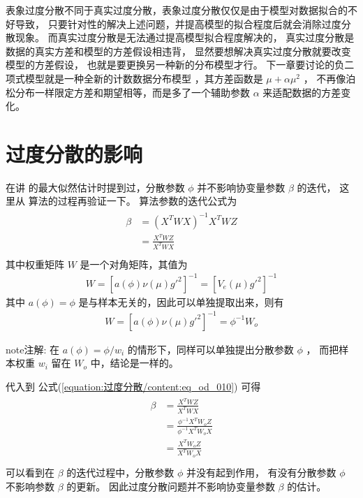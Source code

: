\documentclass[letterpaper,10pt,english]{sphinxmanual}
\begin{document}
表象过度分散不同于真实过度分散，表象过度分散仅仅是由于模型对数据拟合的不好导致，
只要针对性的解决上述问题，并提高模型的拟合程度后就会消除过度分散现象。
而真实过度分散是无法通过提高模型拟合程度解决的，
真实过度分散是数据的真实方差和模型的方差假设相违背，
显然要想解决真实过度分散就要改变模型的方差假设，
也就是要更换另一种新的分布模型才行。
下一章要讨论的负二项式模型就是一种全新的计数数据分布模型
，其方差函数是 \(\mu+\alpha \mu^2\) ，
不再像泊松分布一样限定方差和期望相等，而是多了一个辅助参数 \(\alpha\)
来适配数据的方差变化。


\section{过度分散的影响}
\label{\detokenize{_u8fc7_u5ea6_u5206_u6563/content:id4}}
在讲  的最大似然估计时提到过，分散参数 \(\phi\)
并不影响协变量参数 \(\beta\) 的迭代，
这里从  算法的过程再验证一下。
 算法参数的迭代公式为
\begin{align}\label{equation:过度分散/content:eq_od_010}\!\begin{aligned}
\beta &= (X^T W X)^{-1} X^T W Z\\
&= \frac{X^T W Z}{X^T W X}\\
\end{aligned}\end{align}
其中权重矩阵 \(W\) 是一个对角矩阵，其值为
\begin{equation}\label{equation:过度分散/content:eq_od_011}
\begin{split}W = [a(\phi)\nu(\mu) g'^2]^{-1} = [V_e(\mu) g'^2]^{-1}\end{split}
\end{equation}
其中 \(a(\phi)=\phi\) 是与样本无关的，因此可以单独提取出来，则有
\begin{equation}\label{equation:过度分散/content:过度分散/content:5}
\begin{split}W = [a(\phi)\nu(\mu) g'^2]^{-1} = \phi^{-1}  W_o\end{split}
\end{equation}
\begin{sphinxadmonition}{note}{注解:}
在 \(a(\phi)=\phi/w_i\) 的情形下，同样可以单独提出分散参数 \(\phi\) ，
而把样本权重 \(w_i\) 留在 \(W_o\) 中，结论是一样的。
\end{sphinxadmonition}

代入到 公式(\ref{equation:过度分散/content:eq_od_010}) 可得
\begin{align}\label{equation:过度分散/content:过度分散/content:6}\!\begin{aligned}
\beta &=  \frac{X^T W Z}{X^T W X}\\
&= \frac{\phi^{-1} X^T W_o Z}{\phi^{-1} X^T W_o X}\\
&= \frac{X^T W_o Z}{X^T W_o X}\\
\end{aligned}\end{align}
可以看到在 \(\beta\) 的迭代过程中，分散参数 \(\phi\) 并没有起到作用，
有没有分散参数 \(\phi\) 不影响参数 \(\beta\) 的更新。
因此过度分散问题并不影响协变量参数 \(\beta\) 的估计。
\end{document}
